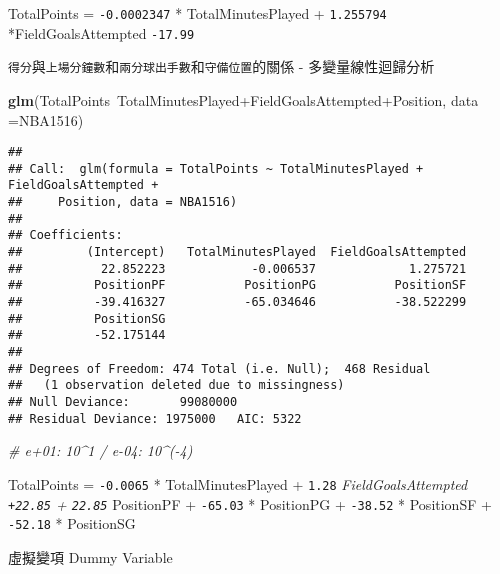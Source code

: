 \documentclass[]{book}
\newenvironment{Shaded}{\begin{snugshade}}{\end{snugshade}}
\newcommand{\KeywordTok}[1]{\textcolor[rgb]{0.13,0.29,0.53}{\textbf{{#1}}}}
\newcommand{\DataTypeTok}[1]{\textcolor[rgb]{0.13,0.29,0.53}{{#1}}}
\newcommand{\CommentTok}[1]{\textcolor[rgb]{0.56,0.35,0.01}{\textit{{#1}}}}
\newcommand{\NormalTok}[1]{{#1}}
\begin{document}
TotalPoints = \texttt{-0.0002347} * TotalMinutesPlayed +
\texttt{1.255794} *FieldGoalsAttempted \texttt{-17.99}

\texttt{得分}與\texttt{上場分鐘數}和\texttt{兩分球出手數}和\texttt{守備位置}的關係
- 多變量線性迴歸分析

\begin{Shaded}
\begin{Highlighting}[]
\KeywordTok{glm}\NormalTok{(TotalPoints~TotalMinutesPlayed+FieldGoalsAttempted+Position,}
    \DataTypeTok{data =}\NormalTok{NBA1516)}
\end{Highlighting}
\end{Shaded}

\begin{verbatim}
## 
## Call:  glm(formula = TotalPoints ~ TotalMinutesPlayed + FieldGoalsAttempted + 
##     Position, data = NBA1516)
## 
## Coefficients:
##         (Intercept)   TotalMinutesPlayed  FieldGoalsAttempted  
##           22.852223            -0.006537             1.275721  
##          PositionPF           PositionPG           PositionSF  
##          -39.416327           -65.034646           -38.522299  
##          PositionSG  
##          -52.175144  
## 
## Degrees of Freedom: 474 Total (i.e. Null);  468 Residual
##   (1 observation deleted due to missingness)
## Null Deviance:       99080000 
## Residual Deviance: 1975000   AIC: 5322
\end{verbatim}

\begin{Shaded}
\begin{Highlighting}[]
\CommentTok{# e+01: 10^1 / e-04: 10^(-4)}
\end{Highlighting}
\end{Shaded}

TotalPoints = \texttt{-0.0065} * TotalMinutesPlayed + \texttt{1.28}
\emph{FieldGoalsAttempted \texttt{+22.85} + \texttt{22.85} } PositionPF
+ \texttt{-65.03} * PositionPG + \texttt{-38.52} * PositionSF +
\texttt{-52.18} * PositionSG

虛擬變項 Dummy Variable
\end{document}
